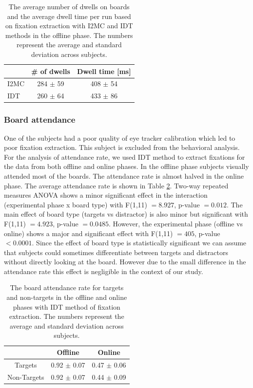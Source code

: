 \documentclass[12pt]{iopart}
\begin{document}
\begin{table}
    \centering
    \caption{The average number of dwells on boards and the average 
        dwell time per run
    based on fixation extraction with I2MC and IDT methods in the
    offline phase.
    The numbers represent the average and standard deviation across subjects.
}
    \begin{tabular}{l | c |c}
        \hline 
        & \# of dwells & Dwell time [ms] \\
        \hline 
        I2MC & 284 $\pm$ 59  & 408 $\pm$ 54 \\
        IDT & 260 $\pm$ 64  & 433 $\pm$ 86 \\
        \hline 
    \end{tabular}
    \label{tab:EyeMethods}
\end{table}
\subsubsection*{Board attendance}
One of the subjects
had a poor quality of eye tracker calibration which led
to poor fixation extraction.
This subject is excluded from the behavioral analysis.
For the analysis of attendance rate, we used IDT method to extract fixations 
for the data from both offline and online phases.
In the offline phase subjects visually attended most of the boards. The attendance rate is almost halved in the online phase. 
The average attendance rate
is shown in Table \ref{tab:boardAtt}. 
Two-way repeated measures ANOVA shows a minor significant effect 
in the interaction (experimental phase x board type) with F(1,11) $= 8.927$, p-value $= 0.012$. 
The main effect of board type (targets vs distractor) is also minor but significant with F(1,11) $= 4.923$, p-value $=0.0485$. 
However, the experimental phase (offline vs online)
shows a major and significant effect with F(1,11) $= 405$, p-value $< 0.0001$.
Since the effect of board type is statistically significant
we can assume that subjects could sometimes differentiate between targets
and distractors without directly looking at the board.
However due to the small difference in the attendance rate
this effect is negligible in the context of our study.


\begin{table}
    \centering
    \caption{The board attendance rate for targets and non-targets in the offline and online phases with IDT method of fixation
        extraction.
    The numbers represent the average and standard deviation across subjects.}
    \begin{tabular}{c | c | c}
        \hline 
        & Offline & Online \\
        \hline 
        Targets & 0.92 $\pm$ 0.07 & 0.47 $\pm$ 0.06 \\
        Non-Targets & 0.92 $\pm$ 0.07 & 0.44 $\pm$ 0.09 \\
        \hline 
    \end{tabular}
    \label{tab:boardAtt}
\end{table}
\end{document}
